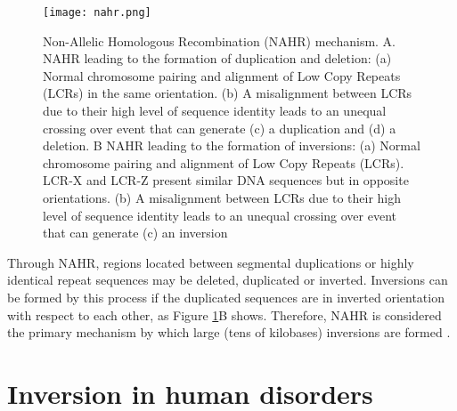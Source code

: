 \begin{figure}[h]

  \centering
    \texttt{[image: nahr.png]}

  \caption{Non-Allelic Homologous Recombination (NAHR) mechanism. A. NAHR leading to the formation of duplication and deletion: (a) Normal chromosome pairing and alignment of Low Copy Repeats (LCRs) in the same orientation. (b) A misalignment between LCRs due to their high level of sequence identity leads to an unequal crossing over event that can generate (c) a duplication and (d) a deletion. B NAHR leading to the formation of inversions: (a) Normal chromosome pairing and alignment of Low Copy Repeats (LCRs). LCR-X and LCR-Z present similar DNA sequences but in opposite orientations. (b) A misalignment between LCRs due to their high level of sequence identity leads to an unequal crossing over event that can generate (c) an inversion}
  \label{fig:nahr}
\end{figure}

Through NAHR, regions located between segmental duplications or highly identical repeat sequences may be deleted, duplicated or inverted. Inversions can be formed by this process if the duplicated sequences are in inverted orientation with respect to each other, as Figure \ref{fig:nahr}B shows. Therefore, NAHR is considered the primary mechanism by which large (tens of kilobases) inversions are formed \cite{feuk_inversion_2010}. 

\section{Inversion in human disorders}

